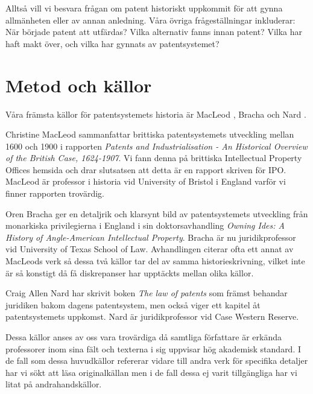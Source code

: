 Alltså vill vi besvara frågan om patent historiskt uppkommit för att gynna
allmänheten eller av annan anledning. Våra övriga frågeställningar inkluderar:
När började patent att utfärdas? Vilka alternativ fanns innan patent?
Vilka har haft makt över, och vilka har gynnats av patentsystemet?


\section{Metod och källor}

Våra främsta källor för patentsystemets historia är MacLeod \cite{macleod},
Bracha \cite{bracha} och Nard \cite{nard}.

Christine MacLeod sammanfattar brittiska patentsystemets utveckling mellan 
1600 och 1900 i rapporten \emph{Patents and Industrialisation - An Historical 
Overview of the British Case, 1624-1907}. Vi fann denna på brittiska 
Intellectual Property Offices hemsida och drar slutsatsen att detta är en 
rapport skriven för IPO. MacLeod är professor i historia vid University of 
Bristol i England varför vi finner rapporten trovärdig.

Oren Bracha ger en detaljrik och klarsynt bild av patentsystemets utveckling 
från monarkiska privilegierna i England i sin doktorsavhandling \emph{Owning 
Ides: A History of Angle-American Intellectual Property}. Bracha är nu 
juridikprofessor vid University of Texas School of Law. Avhandlingen citerar 
ofta ett annat av MacLeods verk så dessa två källor tar del av samma 
historieskrivning, vilket inte är så konstigt då få diskrepanser har upptäckts 
mellan olika källor.

Craig Allen Nard har skrivit boken \emph{The law of patents} som främst 
behandar juridiken bakom dagens patentsystem, men också viger ett kapitel åt 
patentsystemets uppkomst. Nard är juridikprofessor vid Case Western Reserve.

Dessa källor anses av oss vara trovärdiga då samtliga författare är erkända 
professorer inom sina fält och texterna i sig uppvisar hög akademisk standard. 
I de fall som dessa huvudkällor refererar vidare till andra verk för 
specifika detaljer har vi sökt att läsa originalkällan men i de fall dessa ej 
varit tillgängliga har vi litat på andrahandskällor.







